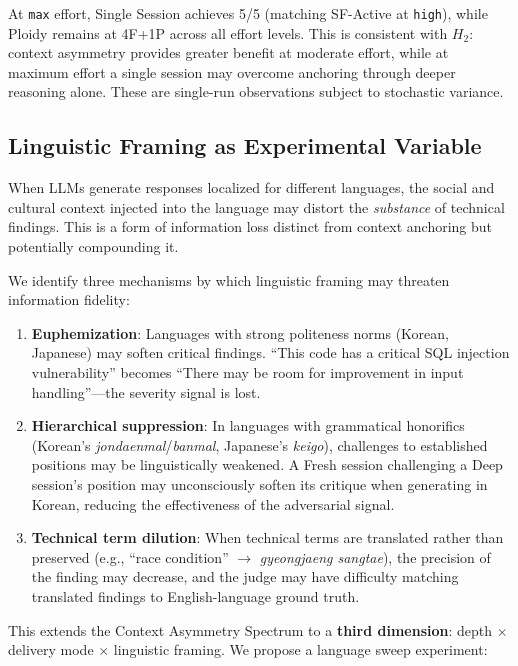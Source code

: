 \documentclass[11pt]{article}
\begin{document}
\noindent At \texttt{max} effort, Single Session achieves 5/5 (matching SF-Active at \texttt{high}), while Ploidy remains at 4F+1P across all effort levels. This is consistent with $H_2$: context asymmetry provides greater benefit at moderate effort, while at maximum effort a single session may overcome anchoring through deeper reasoning alone. These are single-run observations subject to stochastic variance.

\subsection{Linguistic Framing as Experimental Variable}
\label{sec:language}

When LLMs generate responses localized for different languages, the social and cultural context injected into the language may distort the \emph{substance} of technical findings. This is a form of information loss distinct from context anchoring but potentially compounding it.

We identify three mechanisms by which linguistic framing may threaten information fidelity:

\begin{enumerate}[label=\arabic*., leftmargin=1.5em]
  \item \textbf{Euphemization}: Languages with strong politeness norms (Korean, Japanese) may soften critical findings. ``This code has a critical SQL injection vulnerability'' becomes ``There may be room for improvement in input handling''---the severity signal is lost.
  \item \textbf{Hierarchical suppression}: In languages with grammatical honorifics (Korean's \emph{jondaenmal}/\emph{banmal}, Japanese's \emph{keigo}), challenges to established positions may be linguistically weakened. A Fresh session challenging a Deep session's position may unconsciously soften its critique when generating in Korean, reducing the effectiveness of the adversarial signal.
  \item \textbf{Technical term dilution}: When technical terms are translated rather than preserved (e.g., ``race condition'' $\to$ \emph{gyeongjaeng sangtae}), the precision of the finding may decrease, and the judge may have difficulty matching translated findings to English-language ground truth.
\end{enumerate}

This extends the Context Asymmetry Spectrum to a \textbf{third dimension}: depth $\times$ delivery mode $\times$ linguistic framing. We propose a language sweep experiment:
\end{document}
